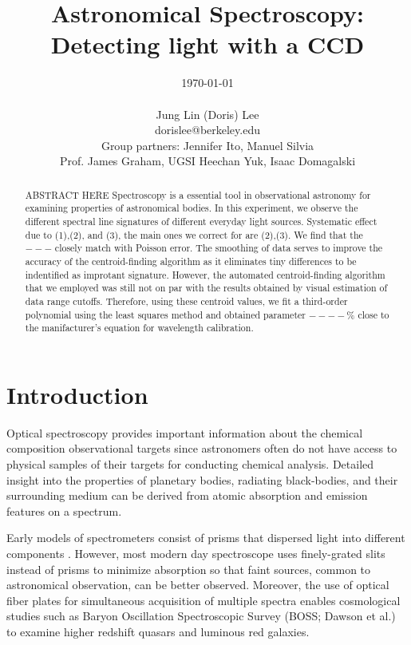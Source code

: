 \documentclass[authoryear, 12pt,5p, times]{elsarticle}
\begin{document}
\begin{frontmatter}
\title{Astronomical Spectroscopy: Detecting light with a CCD}
\author{\today \\ \quad \\Jung Lin (Doris) Lee\\ dorislee@berkeley.edu\\Group partners: Jennifer Ito, Manuel Silvia\\Prof. James Graham, UGSI Heechan Yuk, Isaac Domagalski}
	\begin{abstract}
	ABSTRACT HERE
	Spectroscopy is a essential tool in observational astronomy for examining  properties of astronomical bodies. In this experiment, we observe the different spectral line signatures of different everyday light sources. Systematic effect due to (1),(2), and (3), the main ones we correct for are (2),(3). We find that the  $---$ closely match with Poisson error. The smoothing of data serves to improve the accuracy of the centroid-finding algorithm as it eliminates tiny differences to be indentified as improtant signature. However, the automated centroid-finding algorithm that we employed was still not on par with the results obtained by visual estimation of data range cutoffs. Therefore, using these centroid values, we fit a third-order polynomial using the least squares method and obtained parameter $----$\% close to the manifacturer's equation for wavelength calibration.
  
	\end{abstract}
\end{frontmatter}
\section{Introduction\label{intro}}
Optical spectroscopy provides important information about the chemical composition observational targets since astronomers often do not have access to physical samples of their targets for conducting chemical analysis. Detailed insight into the properties of planetary bodies, radiating black-bodies, and their  surrounding medium can be derived from atomic absorption and emission features on a spectrum.

Early models of spectrometers consist of prisms that dispersed light into different components . However, most modern day spectroscope uses finely-grated slits instead of prisms to minimize absorption so that faint sources, common to astronomical observation, can be better observed. Moreover, the use of optical fiber plates for simultaneous acquisition of multiple spectra enables cosmological studies such as Baryon Oscillation Spectroscopic Survey (BOSS; Dawson et al.) to examine higher redshift quasars and luminous red galaxies.
\end{document}
